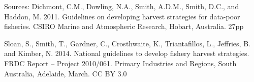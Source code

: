 \documentclass[
  11pt,
]{book}
\begin{document}
Sources: Dichmont, C.M., Dowling, N.A., Smith, A.D.M., Smith, D.C., and Haddon, M. 2011. Guidelines on developing harvest strategies for data-poor fisheries. CSIRO Marine and Atmospheric Research, Hobart, Australia. 27pp

Sloan, S., Smith, T., Gardner, C., Crosthwaite, K., Triantafillos, L., Jeffries, B. and Kimber, N. 2014. National guidelines to develop fishery harvest strategies. FRDC Report -- Project 2010/061. Primary Industries and Regions, South Australia, Adelaide, March. CC BY 3.0

  
\end{document}
